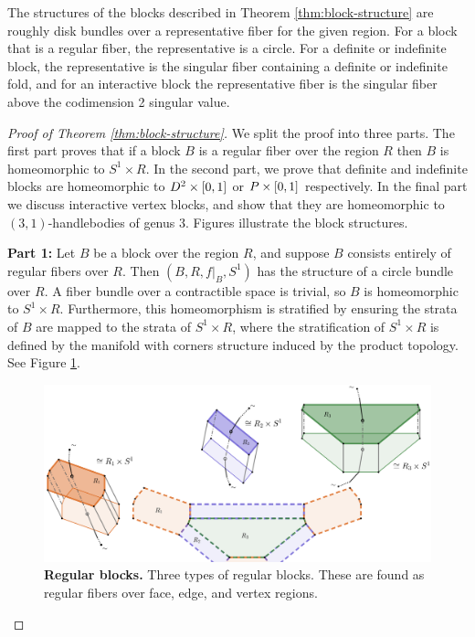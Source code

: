 \begin{rmk}
	The structures of the blocks described in Theorem \ref{thm:block-structure} are roughly disk bundles over a representative fiber for the given region.
	For a block that is a regular fiber, the representative is a circle.
	For a definite or indefinite block, the representative is the singular fiber containing a definite or indefinite fold, and for an interactive block the representative fiber is the singular fiber above the codimension 2 singular value.
\end{rmk}

\begin{proof}[Proof of Theorem \ref{thm:block-structure}]
	We split the proof into three parts.
	The first part proves that if a block $B$ is a regular fiber over the region $R$ then $B$ is homeomorphic to $S^1\times R$.
	In the second part, we prove that definite and indefinite blocks are homeomorphic to $D^2\times[0,1]$ or $P\times[0,1]$ respectively.
	In the final part we discuss interactive vertex blocks, and show that they are homeomorphic to $(3,1)$-handlebodies of genus 3.
	Figures illustrate the block structures.
	
	\textbf{Part 1:}
	Let $B$ be a block over the region $R$, and suppose $B$ consists entirely of regular fibers over $R$.
	Then $(B, R, f|_B, S^1)$ has the structure of a circle bundle over $R$.
	A fiber bundle over a contractible space is trivial, so $B$ is homeomorphic to $S^1 \times R$.
	Furthermore, this homeomorphism is stratified by ensuring the strata of $B$ are mapped to the strata of $S^1 \times R$, where the stratification of $S^1 \times R$ is defined by the manifold with corners structure induced by the product topology.
	See Figure \ref{fig:regular-blocks}.
	
	\begin{figure}[h!]
		\centering
		\includegraphics{figures/regular-blocks.png}
		\caption{
			\textbf{Regular blocks.}
			Three types of regular blocks.
			These are found as regular fibers over face, edge, and vertex regions.
		}
		\label{fig:regular-blocks}
	\end{figure}
	

\end{proof}
